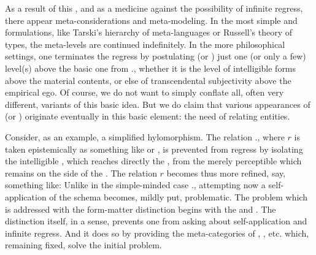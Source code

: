 \pa\label{pa:equfm} As a result of this , and as a medicine
against the possibility of infinite regress, there appear {meta}-considerations
and {meta}-modeling. In the most simple and  formulations, like
Tarski's hierarchy of meta-languages or Russell's theory of types, the
{meta}-levels are continued indefinitely. In the more philosophical settings,
one terminates the regress by postulating (or ) just one (or
only a few) level(s) above the basic one from .,
whether it is the level of intelligible forms above the material contents, or
else of transcendental subjectivity above the empirical ego. Of course, we do
not want to simply conflate all, often very different, variants of this basic
idea. But we do claim that various appearances of  (or )
originate eventually in this basic element: the need of relating
 entities.

Consider, as an example, a simplified hylomorphism. The relation
., where $r$ is taken epistemically as something
like  or , is prevented from regress by
isolating the intelligible , which reaches directly the ,
from the merely perceptible  which remains on the side of the
. The relation $r$ becomes thus more refined, say, something like:
Unlike in the simple-minded case ., attempting
now a self-application of the schema becomes, mildly put, problematic. The
problem which is addressed with the form-matter distinction begins with the
 and . The distinction itself, in a sense,
prevents one from asking about self-application and infinite regress. And it
does so by providing the {meta}-categories of , , etc.
which, remaining fixed, solve the initial problem.

